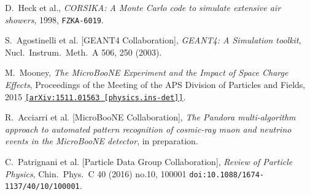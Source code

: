 \documentclass[a4paper,11pt]{article}
\begin{document}
\begin{thebibliography}{99}
   D.~Heck et al.,
  \textit{CORSIKA: A Monte Carlo code to simulate extensive air showers}, 1998,
  \texttt{FZKA-6019}.

   S.~Agostinelli et al. [GEANT4 Collaboration], \textit{GEANT4: A Simulation toolkit}, Nucl.\ Instrum.\ Meth.\ A {506}, 250 (2003).

   M.~Mooney, \textit{The MicroBooNE Experiment and the Impact of Space Charge Effects}, Proceedings of the Meeting of the APS Division of Particles and Fields, 2015 \texttt{\href{https://arxiv.org/abs/1511.01563}{[arXiv:1511.01563 [physics.ins-det]]}}.


   R.~Acciarri et al. [MicroBooNE Collaboration], \textit{The Pandora multi-algorithm approach to automated pattern recognition of cosmic-ray muon and neutrino events in the MicroBooNE detector}, in preparation.

   C.~Patrignani et al. [Particle Data Group Collaboration], \textit{Review of Particle Physics}, Chin.\ Phys.\ C 40 (2016) no.10,  100001 \texttt{doi:10.1088/1674-1137/40/10/100001}.





\end{thebibliography}
\end{document}
